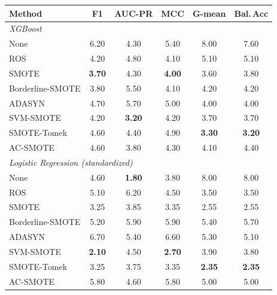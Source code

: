 \begin{minipage}[t]{0.49\textwidth}\centering
\begin{tabular}{@{}lccccc@{}}
\toprule
Method & F1 & AUC-PR & MCC & G-mean & Bal.\,Acc \\
\midrule
\multicolumn{6}{l}{\textit{XGBoost}}\\
None & 6.20 & 4.30 & 5.40 & 8.00 & 7.60 \\
ROS & 4.20 & 4.80 & 4.10 & 5.10 & 5.10 \\
SMOTE & \textbf{3.70} & 4.30 & \textbf{4.00} & 3.60 & 3.80 \\
Borderline-SMOTE & 3.80 & 5.50 & 4.10 & 4.20 & 4.20 \\
ADASYN & 4.70 & 5.70 & 5.00 & 4.00 & 4.00 \\
SVM-SMOTE & 4.20 & \textbf{3.20} & 4.20 & 3.70 & 3.70 \\
SMOTE-Tomek & 4.60 & 4.40 & 4.90 & \textbf{3.30} & \textbf{3.20} \\
AC-SMOTE & 4.60 & 3.80 & 4.30 & 4.10 & 4.40 \\
\midrule
\multicolumn{6}{l}{\textit{Logistic Regression (standardized)}}\\
None & 4.60 & \textbf{1.80} & 3.80 & 8.00 & 8.00 \\
ROS & 5.10 & 6.20 & 4.50 & 3.50 & 3.50 \\
SMOTE & 3.25 & 3.85 & 3.35 & 2.55 & 2.55 \\
Borderline-SMOTE & 5.20 & 5.90 & 5.90 & 5.40 & 5.70 \\
ADASYN & 6.70 & 5.40 & 6.60 & 5.30 & 5.10 \\
SVM-SMOTE & \textbf{2.10} & 4.50 & \textbf{2.70} & 3.90 & 3.80 \\
SMOTE-Tomek & 3.25 & 3.75 & 3.35 & \textbf{2.35} & \textbf{2.35} \\
AC-SMOTE & 5.80 & 4.60 & 5.80 & 5.00 & 5.00 \\
\bottomrule
\end{tabular}
\end{minipage}